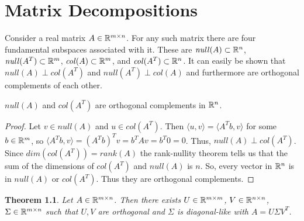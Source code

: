\chapter{Matrix Decompositions}

\newtheorem{theorem}{Theorem}
\newtheorem{proposition}{Proposition}
\newtheorem{corollary}[theorem]{Corollary}
\newtheorem{definition}{Definition}
\newtheorem{definition/theorem}{Definition/Theorem}
\newtheorem{exercise}{Exercise}

Consider a real matrix $A \in \Bbb R^{m \times n}$. For any such matrix there are four fundamental subspaces associated with it. These are $\mathit{null}(A) \subset \Bbb R^n$, $\mathit{null}(A^T) \subset \Bbb R^m$, $\mathit{col}(A) \subset \Bbb R^m$, and $\mathit{col}(A^T) \subset \Bbb R^n$. It can easily be shown that $\mathit{null}(A) \perp \mathit{col}(A^T)$ and $\mathit{null}(A^T) \perp \mathit{col}(A)$ and furthermore are orthogonal complements of each other.

\begin{lemma}
$\mathit{null}(A)$ and $\mathit{col}(A^T)$ are orthogonal complements in $\Bbb R^n$.
\end{lemma}
\begin{proof}
Let $v \in \mathit{null}(A)$ and $u \in \mathit{col}(A^T)$. Then $\langle u, v \rangle = \langle A^Tb, v \rangle$ for some $b \in \Bbb R^m$, so $\langle A^Tb, v \rangle = (A^Tb)^Tv = b^T Av = b^T0 = 0$. Thus, $\mathit{null}(A) \perp \mathit{col}(A^T)$. Since $\mathit{dim} (\mathit{col}(A^T)) = \mathit{rank}(A)$ the rank-nullity theorem tells us that the sum of the dimensions of $\mathit{col}(A^T)$ and $\mathit{null}(A)$ is $n$. So, every vector in $\Bbb R^n$ is in $\mathit{null}(A)$ or $\mathit{col}(A^T)$. Thus they are orthogonal complements.
\end{proof}

\begin{theorem}

Let $A \in \Bbb R^{m \times n}$. Then there exists $U \in \Bbb R^{m \times m}$, $V \in \Bbb R^{n \times n}$, $\Sigma \in \Bbb R^{m \times n}$ such that $U, V$ are orthogonal and $\Sigma$ is diagonal-like with $A = U \Sigma V^{T}$.

\end{theorem}


